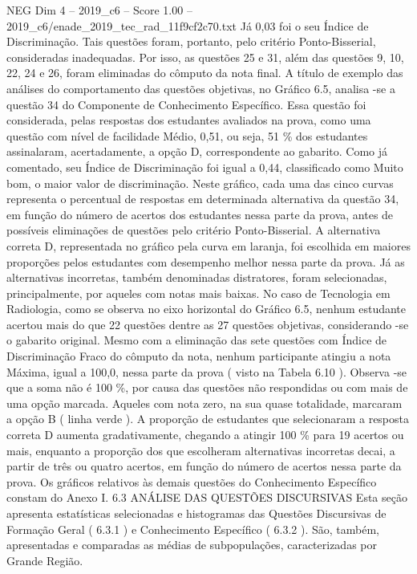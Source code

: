 \begin{textsample}{NEG Dim 4 – 2019\_c6 – Score 1.00 – 2019\_c6/enade\_2019\_tec\_rad\_11f9cf2c70.txt}
Já 0,03 foi o seu Índice de Discriminação.
Tais questões foram, portanto, pelo critério Ponto-Bisserial, consideradas inadequadas.
Por isso, as questões 25 e 31, além das questões 9, 10, 22, 24 e 26, foram eliminadas do cômputo da nota final.
A título de exemplo das análises do comportamento das questões objetivas, no Gráfico 6.5, analisa -se a questão 34 do Componente de Conhecimento Específico.
Essa questão foi considerada, pelas respostas dos estudantes avaliados na prova, como uma questão com nível de facilidade Médio, 0,51, ou seja, 51 \% dos estudantes assinalaram, acertadamente, a opção D, correspondente ao gabarito.
Como já comentado, seu Índice de Discriminação foi igual a 0,44, classificado como Muito bom, o maior valor de discriminação.
Neste gráfico, cada uma das cinco curvas representa o percentual de respostas em determinada alternativa da questão 34, em função do número de acertos dos estudantes nessa parte da prova, antes de possíveis eliminações de questões pelo critério Ponto-Bisserial.
A alternativa correta D, representada no gráfico pela curva em laranja, foi escolhida em maiores proporções pelos estudantes com desempenho melhor nessa parte da prova.
Já as alternativas incorretas, também denominadas distratores, foram selecionadas, principalmente, por aqueles com notas mais baixas.
No caso de Tecnologia em Radiologia, como se observa no eixo horizontal do Gráfico 6.5, nenhum estudante acertou mais do que 22 questões dentre as 27 questões objetivas, considerando -se o gabarito original.
Mesmo com a eliminação das sete questões com Índice de Discriminação Fraco do cômputo da nota, nenhum participante atingiu a nota Máxima, igual a 100,0, nessa parte da prova ( visto na Tabela 6.10 ).
Observa -se que a soma não é 100 \%, por causa das questões não respondidas ou com mais de uma opção marcada.
Aqueles com nota zero, na sua quase totalidade, marcaram a opção B ( linha verde ).
A proporção de estudantes que selecionaram a resposta correta D aumenta gradativamente, chegando a atingir 100 \% para 19 acertos ou mais, enquanto a proporção dos que escolheram alternativas incorretas decai, a partir de três ou quatro acertos, em função do número de acertos nessa parte da prova.
Os gráficos relativos às demais questões do Conhecimento Específico constam do Anexo I. 6.3 ANÁLISE DAS QUESTÕES DISCURSIVAS Esta seção apresenta estatísticas selecionadas e histogramas das Questões Discursivas de Formação Geral ( 6.3.1 ) e Conhecimento Específico ( 6.3.2 ).
São, também, apresentadas e comparadas as médias de subpopulações, caracterizadas por Grande Região.

\end{textsample}
